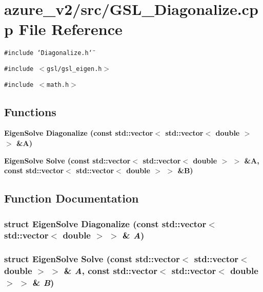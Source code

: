 \section{azure\_\-v2/src/GSL\_\-Diagonalize.cpp File Reference}
\label{GSL__Diagonalize_8cpp}
{\tt \#include \char`\"{}Diagonalize.h\char`\"{}}\par
{\tt \#include $<$gsl/gsl\_\-eigen.h$>$}\par
{\tt \#include $<$math.h$>$}\par
\subsection*{Functions}
\begin{CompactItemize}
\item 
\bf{Eigen\-Solve} \bf{Diagonalize} (const std::vector$<$ std::vector$<$ double $>$ $>$ \&A)
\item 
\bf{Eigen\-Solve} \bf{Solve} (const std::vector$<$ std::vector$<$ double $>$ $>$ \&A, const std::vector$<$ std::vector$<$ double $>$ $>$ \&B)
\end{CompactItemize}


\subsection{Function Documentation}
\subsubsection{\setlength{\rightskip}{0pt plus 5cm}struct \bf{Eigen\-Solve} Diagonalize (const std::vector$<$ std::vector$<$ double $>$ $>$ \& {\em A})}\label{GSL__Diagonalize_8cpp_9ce40434358bc506a84d99c0b4b3a1df}


\subsubsection{\setlength{\rightskip}{0pt plus 5cm}struct \bf{Eigen\-Solve} Solve (const std::vector$<$ std::vector$<$ double $>$ $>$ \& {\em A}, const std::vector$<$ std::vector$<$ double $>$ $>$ \& {\em B})}\label{GSL__Diagonalize_8cpp_5ed9f40ef78a4b50c1c50fbfa1519948}


